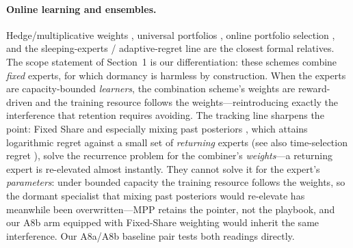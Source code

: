 \documentclass{article}
\begin{document}
\paragraph{Online learning and ensembles.} Hedge/multiplicative weights
\citep{freund1997decision, arora2012multiplicative}, universal portfolios
\citep{cover1991universal}, online portfolio selection \citep{li2014online},
and the sleeping-experts / adaptive-regret line
\citep{freund1997sleeping, hazan2009adaptive, daniely2015strongly} are the
closest formal relatives. The scope statement of Section~1 is our
differentiation: these schemes combine \emph{fixed} experts, for which
dormancy is harmless by construction. When the experts are capacity-bounded
\emph{learners}, the combination scheme's weights are reward-driven and the
training resource follows the weights---reintroducing exactly the
interference that retention requires avoiding. The tracking line sharpens
the point: Fixed Share \citep{herbster1998tracking} and especially mixing
past posteriors \citep{bousquet2002mixing}, which attains logarithmic
regret against a small set of \emph{returning} experts (see also
time-selection regret \citep{blum2007external}), solve the recurrence
problem for the combiner's \emph{weights}---a returning expert is
re-elevated almost instantly. They cannot solve it for the expert's
\emph{parameters}: under bounded capacity the training resource follows
the weights, so the dormant specialist that mixing past posteriors would
re-elevate has meanwhile been overwritten---MPP retains the pointer, not
the playbook, and our A8b arm equipped with Fixed-Share weighting would
inherit the same interference. Our A8a/A8b baseline pair
tests both readings directly.
\end{document}
